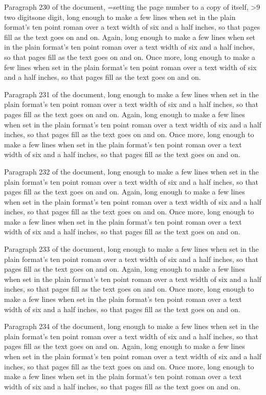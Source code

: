 Paragraph 230 of the document, \edef\pd{\the\count0}=\pd\relax setting the page number to a copy of itself, \ifnum\pd>9 two digits\else one digit\fi, long enough to make a few lines when set in the plain format's ten point roman over a text width of six and a half inches, so that pages fill as the text goes on and on. Again, long enough to make a few lines when set in the plain format's ten point roman over a text width of six and a half inches, so that pages fill as the text goes on and on. Once more, long enough to make a few lines when set in the plain format's ten point roman over a text width of six and a half inches, so that pages fill as the text goes on and on.

Paragraph 231 of the document, long enough to make a few lines when set in the plain format's ten point roman over a text width of six and a half inches, so that pages fill as the text goes on and on. Again, long enough to make a few lines when set in the plain format's ten point roman over a text width of six and a half inches, so that pages fill as the text goes on and on. Once more, long enough to make a few lines when set in the plain format's ten point roman over a text width of six and a half inches, so that pages fill as the text goes on and on.

Paragraph 232 of the document, long enough to make a few lines when set in the plain format's ten point roman over a text width of six and a half inches, so that pages fill as the text goes on and on. Again, long enough to make a few lines when set in the plain format's ten point roman over a text width of six and a half inches, so that pages fill as the text goes on and on. Once more, long enough to make a few lines when set in the plain format's ten point roman over a text width of six and a half inches, so that pages fill as the text goes on and on.

Paragraph 233 of the document, long enough to make a few lines when set in the plain format's ten point roman over a text width of six and a half inches, so that pages fill as the text goes on and on. Again, long enough to make a few lines when set in the plain format's ten point roman over a text width of six and a half inches, so that pages fill as the text goes on and on. Once more, long enough to make a few lines when set in the plain format's ten point roman over a text width of six and a half inches, so that pages fill as the text goes on and on.

Paragraph 234 of the document, long enough to make a few lines when set in the plain format's ten point roman over a text width of six and a half inches, so that pages fill as the text goes on and on. Again, long enough to make a few lines when set in the plain format's ten point roman over a text width of six and a half inches, so that pages fill as the text goes on and on. Once more, long enough to make a few lines when set in the plain format's ten point roman over a text width of six and a half inches, so that pages fill as the text goes on and on.

